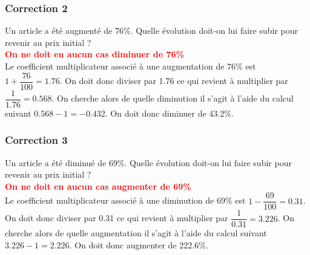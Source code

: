 \documentclass[15pt, mathserif]{beamer}
\begin{document}
\begin{frame}
\vspace{-10mm}
	\frametitle{Correction 2}
\vspace*{1cm} Un article a été augmenté de 76\%. Quelle évolution doit-on lui faire subir pour revenir au prix initial ? \\ \bcattention \textcolor{red}{\textbf{On ne doit en aucun cas diminuer de 76\% }} \\ Le coefficient multiplicateur associé à une augmentation de 76\% est $1+\dfrac{76}{100}=1.76$. On doit donc diviser par 1.76 ce qui revient à multiplier par $\dfrac{1}{1.76}=0.568$. On cherche alors de quelle diminution il s'agit à l'aide du calcul suivant $0.568-1=-0.432$. On doit donc diminuer de 43.2\%. \\ \begin{center}  
  \end{center}\end{frame}


\begin{frame}
\vspace{-10mm}
	\frametitle{Correction 3}
\vspace*{1cm} Un article a été diminué de 69\%. Quelle évolution doit-on lui faire subir pour revenir au prix initial ? \\ \bcattention \textcolor{red}{\textbf{On ne doit en aucun cas augmenter de 69\%}} \\ Le coefficient multiplicateur associé à une diminution de 69\% est $1-\dfrac{69}{100}=0.31$. On doit donc diviser par 0.31 ce qui revient à multiplier par $\dfrac{1}{0.31}=3.226$. On cherche alors de quelle augmentation il s'agit à l'aide du calcul suivant $3.226-1=2.226$. On doit donc augmenter de 222.6\%. \\ \begin{center}  
  \end{center}\end{frame}
\end{document}
